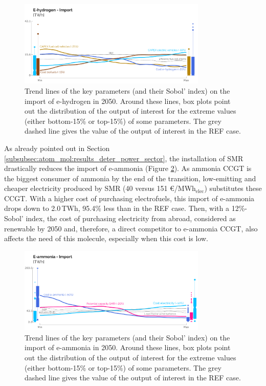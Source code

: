 \documentclass[11pt,twoside,a4paper,english]{article}
\begin{document}
\begin{figure}[htbp!]
\centering
\includegraphics[width=0.8\textwidth]{UQ_H2_samples_2.pdf}
\caption{Trend lines of the key parameters (and their Sobol' index) on the import of e-hydrogen in 2050. Around these lines, box plots point out the distribution of the output of interest for the extreme values (either bottom-15\% or top-15\%) of some parameters. The grey dashed line gives the value of the output of interest in the REF case. }
\label{fig:results_uq_samples_H2}
\end{figure}

As already pointed out in Section \ref{subsubsec:atom_mol:results_deter_power_sector}, the installation of \gls{SMR} drastically reduces the import of e-ammonia (Figure \ref{fig:results_uq_samples_ammonia}). As ammonia \gls{CCGT} is the biggest consumer of ammonia by the end of the transition, low-emitting and cheaper electricity produced by \gls{SMR} (40 versus 151 €/MWh$_{\text{elec}}$) substitutes these \gls{CCGT}. With a higher cost of purchasing electrofuels, this import of e-ammonia drops down to 2.0\,TWh, 95.4\% less than in the REF case. Then, with a 12\%-Sobol' index, the cost of purchasing electricity from abroad, considered as renewable by 2050 and, therefore, a direct competitor to e-ammonia \gls{CCGT}, also affects the need of this molecule, especially when this cost is low.

\begin{figure}[htbp!]
\centering
\includegraphics[width=0.8\textwidth]{UQ_Ammonia_samples_2.pdf}
\caption{Trend lines of the key parameters (and their Sobol' index) on the import of e-ammonia in 2050. Around these lines, box plots point out the distribution of the output of interest for the extreme values (either bottom-15\% or top-15\%) of some parameters. The grey dashed line gives the value of the output of interest in the REF case. }
\label{fig:results_uq_samples_ammonia}
\end{figure}
\end{document}
